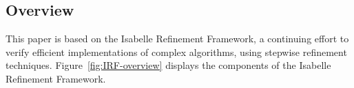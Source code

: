\documentclass[a4paper,UKenglish,cleveref, autoref, thm-restate]{lipics-v2021}
\begin{document}


%
%



\subsection{Overview}\label{sec:intro_overview}
This paper is based on the Isabelle Refinement Framework, a continuing effort
to verify efficient implementations of complex algorithms, using stepwise refinement techniques.
Figure~\ref{fig:IRF-overview} displays the components of the Isabelle Refinement Framework.
\end{document}
